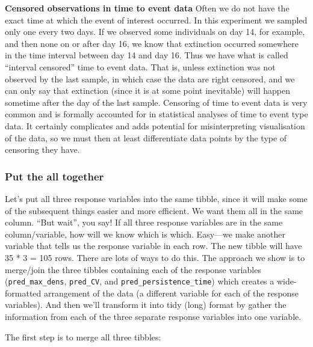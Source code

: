 \documentclass[]{book}
\newenvironment{Shaded}{\begin{snugshade}}{\end{snugshade}}
\newcommand{\KeywordTok}[1]{\textcolor[rgb]{0.13,0.29,0.53}{\textbf{#1}}}
\newcommand{\NormalTok}[1]{#1}
\newcommand{\OperatorTok}[1]{\textcolor[rgb]{0.81,0.36,0.00}{\textbf{#1}}}
\newcommand{\StringTok}[1]{\textcolor[rgb]{0.31,0.60,0.02}{#1}}
\begin{document}
\begin{info}
\textbf{Censored observations in time to event data} Often we do not
have the exact time at which the event of interest occurred. In this
experiment we sampled only one every two days. If we observed some
individuals on day 14, for example, and then none on or after day 16, we
know that extinction occurred somewhere in the time interval between day
14 and day 16. Thus we have what is called ``interval censored'' time to
event data. That is, unless extinction was not observed by the last
sample, in which case the data are right censored, and we can only say
that extinction (since it is at some point inevitable) will happen
sometime after the day of the last sample. Censoring of time to event
data is very common and is formally accounted for in statistical
analyses of time to event type data. It certainly complicates and adds
potential for misinterpreting visualisation of the data, so we must then
at least differentiate data points by the type of censoring they have.
\end{info}

\hypertarget{put-the-all-together}{%
\subsubsection{Put the all together}\label{put-the-all-together}}

Let's put all three response variables into the same tibble, since it will make some of the subsequent things easier and more efficient. We want them all in the same column. ``But wait'', you say! If all three response variables are in the same column/variable, how will we know which is which. Easy---we make another variable that tells us the response variable in each row. The new tibble will have 35 * 3 = 105 rows. There are lots of ways to do this. The approach we show is to merge/join the three tibbles containing each of the response variables (\texttt{pred\_max\_dens}, \texttt{pred\_CV}, and \texttt{pred\_persistence\_time}) which creates a wide-formatted arrangement of the data (a different variable for each of the response variables). And then we'll transform it into tidy (long) format by gather the information from each of the three separate response variables into one variable.

The first step is to merge all three tibbles:

\begin{Shaded}
\end{Shaded}
\end{document}
